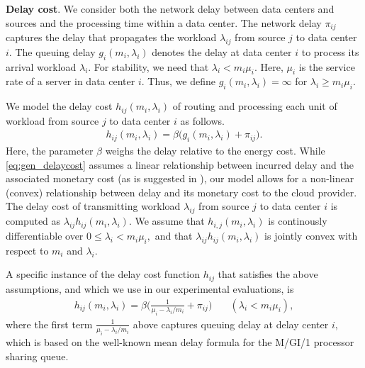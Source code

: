 \textbf{Delay cost}. We consider both the network delay between data centers and sources and the processing time within a data center. The network delay $\pi_{ij}$ captures the delay that propagates the workload $\lambda_{ij}$ from source $j$ to data center $i$. The queuing delay  $g_i(m_i,\lambda_i)$ denotes the delay at data center $i$ to process its arrival workload $\lambda_i$. %
For stability, we need that $\lambda_i < m_i \mu _i$.
Here, $\mu _i$ is the service rate of a server in data center $i$.
Thus, we define $g_{i}(m_i, \lambda_{i}) = \infty$ for $\lambda_i \geq m_i \mu_i.$

We model the delay cost $h_{ij}(m_i,\lambda_i)$ of routing and processing each unit of workload from source $j$ to data center $i$ as follows.
\begin{eqnarray}
\label{eq:gen_delaycost}  
h_{ij}(m_i, \lambda_{i}) = \beta \big ( g_i(m_i,\lambda_i) + \pi_{ij}  \big ).
\end{eqnarray}
Here, the parameter $\beta$ weighs the delay relative to the energy
cost. While {\eqref{eq:gen_delaycost}} assumes a linear relationship
between incurred delay and the associated monetary cost (as is
suggested in {\cite{Beheshti2012PerformanceImpact}}), our model allows
for a non-linear (convex) relationship between delay and its monetary
cost to the cloud provider. The delay cost of transmitting workload
{$\lambda_{ij}$} from source $j$ to data center {$i$} is computed as
$\lambda_{ij}h_{ij}(m_i,\lambda_i)$.  We assume that
$h_{i,j}(m_i, \lambda_{i})$ is continously differentiable over
$0 \leq \lambda_i < m_i \mu_i,$ and that
$\lambda_{ij}h_{ij}(m_i, \lambda_{i})$ is jointly convex with respect
to $m_i$ and $\lambda_{i}.$


A specific instance of the delay cost function $h_{ij}$ that satisfies
the above assumptions, and which we use in our experimental
evaluations, is
\begin{eqnarray}
\label{eq:delaycost}
h_{ij}(m_i, \lambda_{i}) = \beta \bigg (\frac{1}{\mu_i - \lambda_i/m_i} + \pi_{ij}  \bigg ) & \quad (\lambda_i < m_i\mu_i),
\end{eqnarray}
where the first term $\frac{1}{\mu_i - \lambda_i/m_i}$ above
captures queuing delay at delay center $i,$ which is based on the
well-known mean delay formula for the M/GI/1 processor sharing
queue.

